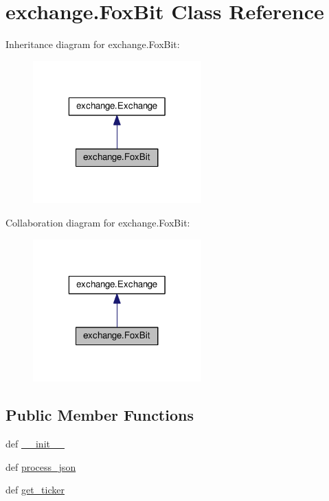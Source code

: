 \hypertarget{classexchange_1_1_fox_bit}{\section{exchange.\-Fox\-Bit Class Reference}
\label{classexchange_1_1_fox_bit}
}


Inheritance diagram for exchange.\-Fox\-Bit\-:
\nopagebreak
\begin{figure}[H]
\begin{center}
\leavevmode
\includegraphics[width=184pt]{classexchange_1_1_fox_bit__inherit__graph}
\end{center}
\end{figure}


Collaboration diagram for exchange.\-Fox\-Bit\-:
\nopagebreak
\begin{figure}[H]
\begin{center}
\leavevmode
\includegraphics[width=184pt]{classexchange_1_1_fox_bit__coll__graph}
\end{center}
\end{figure}
\subsection*{Public Member Functions}
\begin{DoxyCompactItemize}
\item 
def \hyperlink{classexchange_1_1_fox_bit_aeeafe8e1c8237d514ce89c97727ed61d}{\-\_\-\-\_\-init\-\_\-\-\_\-}
\item 
def \hyperlink{classexchange_1_1_fox_bit_a39b6db26f882648f4dfb25d78608ed1d}{process\-\_\-json}
\item 
def \hyperlink{classexchange_1_1_fox_bit_a4a2bd57624f0aed8e1bf22ce6399bd3e}{get\-\_\-ticker}
\end{DoxyCompactItemize}
